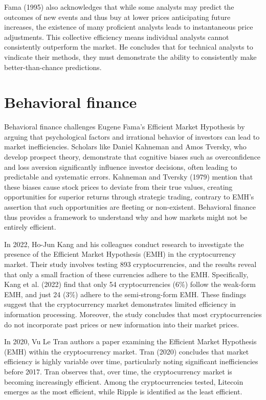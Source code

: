 Fama (1995) also acknowledges that while some analysts may predict the outcomes of new events and thus buy at lower prices anticipating future increases, the existence of many proficient analysts leads to instantaneous price adjustments. This collective efficiency means individual analysts cannot consistently outperform the market. He concludes that for technical analysts to vindicate their methods, they must demonstrate the ability to consistently make better-than-chance predictions.

\section{Behavioral finance}
Behavioral finance challenges Eugene Fama's Efficient Market Hypothesis by arguing that psychological factors and irrational behavior of investors can lead to market inefficiencies. Scholars like Daniel Kahneman and Amos Tversky, who develop prospect theory, demonstrate that cognitive biases such as overconfidence and loss aversion significantly influence investor decisions, often leading to predictable and systematic errors. Kahneman and Tversky (1979) mention that these biases cause stock prices to deviate from their true values, creating opportunities for superior returns through strategic trading, contrary to EMH’s assertion that such opportunities are fleeting or non-existent. Behavioral finance thus provides a framework to understand why and how markets might not be entirely efficient.

In 2022, Ho-Jun Kang and his colleagues conduct research to investigate the presence of the Efficient Market Hypothesis (EMH) in the cryptocurrency market. Their study involves testing 893 cryptocurrencies, and the results reveal that only a small fraction of these currencies adhere to the EMH. Specifically, Kang et al. (2022) find that only 54 cryptocurrencies (6\%) follow the weak-form EMH, and just 24 (3\%) adhere to the semi-strong-form EMH. These findings suggest that the cryptocurrency market demonstrates limited efficiency in information processing. Moreover, the study concludes that most cryptocurrencies do not incorporate past prices or new information into their market prices.

In 2020, Vu Le Tran authors a paper examining the Efficient Market Hypothesis (EMH) within the cryptocurrency market. Tran (2020) concludes that market efficiency is highly variable over time, particularly noting significant inefficiencies before 2017. Tran observes that, over time, the cryptocurrency market is becoming increasingly efficient. Among the cryptocurrencies tested, Litecoin emerges as the most efficient, while Ripple is identified as the least efficient.

